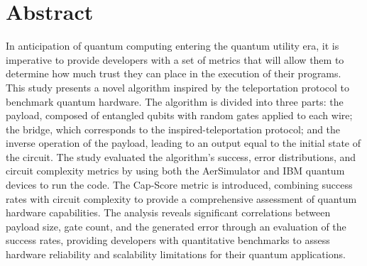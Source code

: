 \section*{Abstract}

In anticipation of quantum computing entering the quantum utility era, it is imperative to provide developers with a set of metrics that will allow them to determine how much trust they can place in the execution of their programs. This study presents a novel algorithm inspired by the teleportation protocol to benchmark quantum hardware. The algorithm is divided into three parts: the payload, composed of entangled qubits with random gates applied to each wire; the bridge, which corresponds to the inspired-teleportation protocol; and the inverse operation of the payload, leading to an output equal to the initial state of the circuit. The study evaluated the algorithm's success, error distributions, and circuit complexity metrics by using both the AerSimulator and IBM quantum devices to run the code. The Cap-Score metric is introduced, combining success rates with circuit complexity to provide a comprehensive assessment of quantum hardware capabilities. The analysis reveals significant correlations between payload size, gate count, and the generated error through an evaluation of the success rates, providing developers with quantitative benchmarks to assess hardware reliability and scalability limitations for their quantum applications.